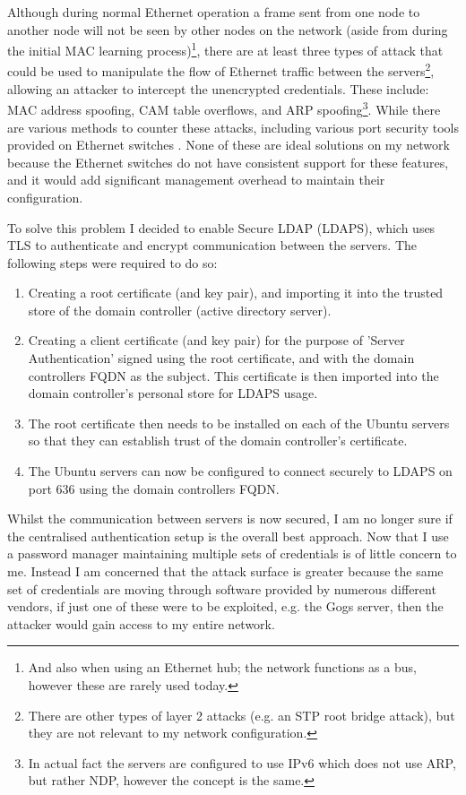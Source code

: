 \documentclass[11pt,a4paper]{scrartcl}
\begin{document}
\begin{refsection}
Although during normal Ethernet operation a frame sent from one node to another node will not be seen by other nodes on the network (aside from during the initial MAC learning process)\footnote{And also when using an Ethernet hub; the network functions as a bus, however these are rarely used today.}, there are at least three types of attack that could be used to manipulate the flow of Ethernet traffic between the servers\footnote{There are other types of layer 2 attacks (e.g. an STP root bridge attack), but they are not relevant to my network configuration.}, allowing an attacker to intercept the unencrypted credentials.
These include: MAC address spoofing, CAM table overflows, and ARP spoofing\footnote{In actual fact the servers are configured to use IPv6 which does not use ARP, but rather NDP, however the concept is the same.}.
While there are various methods to counter these attacks, including various port security tools provided on Ethernet switches \cite[193]{odom_icnd1}.
None of these are ideal solutions on my network because the Ethernet switches do not have consistent support for these features, and it would add significant management overhead to maintain their configuration. 

To solve this problem I decided to enable Secure LDAP (LDAPS), which uses TLS to authenticate and encrypt communication between the servers. The following steps were required to do so:
\begin{enumerate}
	\item Creating a root certificate (and key pair), and importing it into the trusted store of the domain controller (active directory server).
	\item Creating a client certificate (and key pair) for the purpose of 'Server Authentication' signed using the root certificate, and with the domain controllers FQDN as the subject. This certificate is then imported into the domain controller's personal store for LDAPS usage.
	\item The root certificate then needs to be installed on each of the Ubuntu servers \cite{ubuntu_ca_cert} so that they can establish trust of the domain controller's certificate.
	\item The Ubuntu servers can now be configured to connect securely to LDAPS on port 636 using the domain controllers FQDN.
\end{enumerate}

Whilst the communication between servers is now secured, I am no longer sure if the centralised authentication setup is the overall best approach. Now that I use a password manager maintaining multiple sets of credentials is of little concern to me. Instead I am concerned that the attack surface is greater because the same set of credentials are moving through software provided by numerous different vendors, if just one of these were to be exploited, e.g. the Gogs server, then the attacker would gain access to my entire network.

\printbibliography

\end{refsection}
\end{document}
